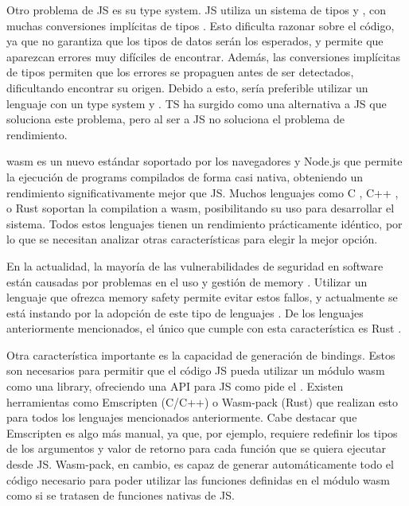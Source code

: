 Otro problema de \gls{JS} es su \gls{type system}. \gls{JS} utiliza un sistema de
tipos  y ,
con muchas conversiones implícitas de tipos \parencite{js-type-system}. Esto
dificulta razonar sobre el código, ya que no garantiza que los tipos de datos
serán los esperados, y permite que aparezcan errores muy difíciles de encontrar.
Además, las conversiones implícitas de tipos permiten que los errores se
propaguen antes de ser detectados, dificultando encontrar su origen. Debido a
esto, sería preferible utilizar un lenguaje con un \gls{type system}
 y .
\gls{TS} \parencite{typescript} ha surgido como una alternativa a \gls{JS} que
soluciona este problema, pero al ser  a \gls{JS}
no soluciona el problema de rendimiento.

\gls{wasm} \parencite{wasm} es un nuevo estándar soportado por los navegadores y
Node.js que permite la ejecución de \glspl{program} compilados de forma casi
nativa, obteniendo un rendimiento significativamente mejor que \gls{JS}. Muchos
lenguajes como C \parencite{C}, C++ \parencite{cpp}, o Rust \parencite{Rust}
soportan la \gls{compilation} a \gls{wasm}, posibilitando su uso para desarrollar el
sistema. Todos estos lenguajes tienen un rendimiento prácticamente idéntico, por
lo que se necesitan analizar otras características para elegir la mejor opción.

En la actualidad, la mayoría de las vulnerabilidades de seguridad en software
están causadas por problemas en el uso y gestión de \gls{memory}
\parencite{microsoft-memory-safety} \parencite{mozilla-memory-safety}. Utilizar
un lenguaje que ofrezca \gls{memory safety} permite evitar estos fallos, y
actualmente se está instando por la adopción de este tipo de lenguajes
\parencite{CISA-memory-safety} \parencite{whitehouse-memory-safety}. De los
lenguajes anteriormente mencionados, el único que cumple con esta característica
es Rust \parencite{C-memory-safety}. %

Otra característica importante es la capacidad de generación de \glspl{binding}.
Estos son necesarios para permitir que el código \gls{JS} pueda utilizar un
módulo \gls{wasm} como una \gls{library}, ofreciendo una \gls{API} para \gls{JS}
como pide el . Existen herramientas como Emscripten (C/C++)
\parencite{Emscripten} o Wasm-pack (Rust) \parencite{Wasm-pack} que realizan
esto para todos los lenguajes mencionados anteriormente. Cabe destacar que
Emscripten es algo más manual, ya que, por ejemplo, requiere redefinir los tipos
de los argumentos y valor de retorno para cada función que se quiera ejecutar
desde \gls{JS}. Wasm-pack, en cambio, es capaz de generar automáticamente todo
el código necesario para poder utilizar las funciones definidas en el módulo
\gls{wasm} como si se tratasen de funciones nativas de \gls{JS}.

